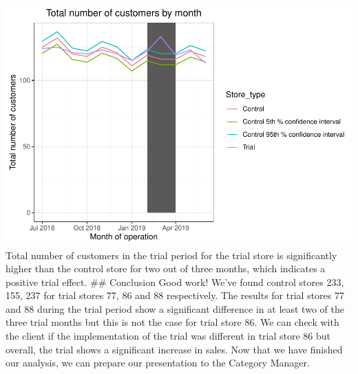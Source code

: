 \documentclass[
]{article}
\begin{document}
\includegraphics{InsideSherpa_Task2_files/figure-latex/unnamed-chunk-25-1}
Total number of customers in the trial period for the trial store is
significantly higher than the control store for two out of three months,
which indicates a positive trial effect. \#\# Conclusion Good work!
We've found control stores 233, 155, 237 for trial stores 77, 86 and 88
respectively. The results for trial stores 77 and 88 during the trial
period show a significant difference in at least two of the three trial
months but this is not the case for trial store 86. We can check with
the client if the implementation of the trial was different in trial
store 86 but overall, the trial shows a significant increase in sales.
Now that we have finished our analysis, we can prepare our presentation
to the Category Manager.
\end{document}
